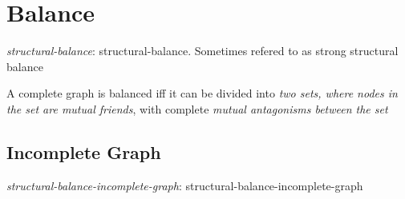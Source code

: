 \section{Balance}

  \begin{definition}
    \emph{\Gls{structural-balance}}: \glsdesc{structural-balance}. Sometimes
    refered to as strong structural balance
  \end{definition}

  \begin{theorem}
    A complete graph is balanced iff it can be divided into \emph{two sets, where
    nodes in the set are mutual friends}, with complete
    \emph{mutual antagonisms between the set}
  \end{theorem}

  \subsection{Incomplete Graph}

    \begin{definition}
      \emph{\Gls{structural-balance-incomplete-graph}}:
      \glsdesc{structural-balance-incomplete-graph}
    \end{definition}
